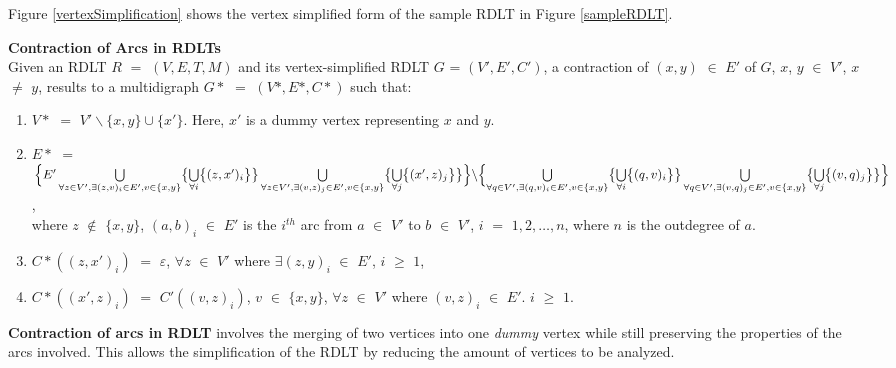 Figure \ref{vertexSimplification} shows the vertex simplified form of the sample RDLT in Figure \ref{sampleRDLT}.

 \begin{defn}\textbf{Contraction of Arcs in RDLTs} \cite{Malinao2017}\\
    Given an RDLT $ R $ $ = $ $ (V,E,T,M) $ and its vertex-simplified RDLT $ G $ = $ (V',E',C') $, a contraction of $ (x,y) $ $ \in $ $ E' $ of $ G $, $ x $, $ y $ $\in $ $ V' $, $ x $ $ \neq $ $ y $, results to a multidigraph $ G* $ $ = $ $ (V*,E*,C*) $ such that:
    \begin{enumerate}
        \item $ V* $ $ = $ $ V'\backslash\{x,y\} \cup \{x'\} $. Here, $ x' $ is a dummy vertex representing $ x $ and $ y $.
        \item $ E* $ $ = $ $ \Bigl\{ E' \bigcup\limits_{\forall z \in V', \exists (z,v)_i \in E', v \in \{x,y\} } \bigl\{ \bigcup\limits_{\forall i} \bigl\{ (z,x')_i \bigr\} \bigr\} \bigcup\limits_{\forall z \in V', \exists (v,z)_j \in E', v \in \{x,y\} } \bigl\{ \bigcup\limits_{\forall j} \bigl\{ (x',z)_j \bigr\} \bigr\} \Bigr\} \backslash \\ \Bigl\{ \bigcup\limits_{\forall q \in V', \exists (q,v)_i \in E', v \in \{x,y\} } \bigl\{ \bigcup\limits_{\forall i} \bigl\{ (q,v)_i \bigr\} \bigr\} \bigcup\limits_{\forall q \in V', \exists (v,q)_j \in E', v \in \{x,y\} } \bigl\{ \bigcup\limits_{\forall j} \bigl\{ (v,q)_j \bigr\} \bigr\} \Bigr\}$, \\
        where $ z $ $ \notin $ $ \{x,y\} $, $ (a,b)_i $ $ \in $ $ E' $ is the $ i^{th} $ arc from $ a $ $ \in $ $ V' $ to $ b $ $ \in $ $ V' $, $ i $ $ = $ $ 1, 2, \ldots, n $, where $ n $ is the outdegree of $ a $.
        \item  $ C*((z,x')_i) $ $ = $ $ \varepsilon $, $ \forall z $ $ \in $ $ V' $ where $ \exists (z,y)_i $ $ \in $ $ E' $, $ i $ $ \geq $ $ 1 $,
        \item $ C*((x',z)_i) $ $ = $ $ C'((v,z)_i) $, $ v $ $ \in $ $ \{x,y\} $, $ \forall z $ $ \in $ $ V' $ where $ (v,z)_i $ $ \in $ $ E' $. $ i $ $ \geq $ $ 1 $.
    \end{enumerate}
\end{defn}
\textbf{Contraction of arcs in RDLT} involves the merging of two vertices into one \emph{dummy} vertex while still preserving the properties of the arcs involved. This allows the simplification of the RDLT by reducing the amount of vertices to be analyzed.

